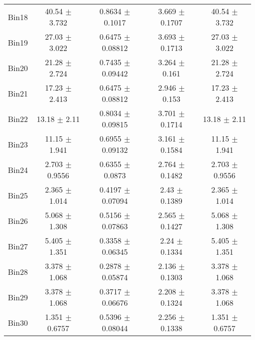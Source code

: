 \begin{tabular}{@{\extracolsep{4pt}}lcccc@{}}
     Bin18 & 40.54 $\pm$ 3.732 & 0.8634 $\pm$ 0.1017 & 3.669 $\pm$ 0.1707 & 40.54 $\pm$ 3.732 \\ 
     Bin19 & 27.03 $\pm$ 3.022 & 0.6475 $\pm$ 0.08812 & 3.693 $\pm$ 0.1713 & 27.03 $\pm$ 3.022 \\ 
     Bin20 & 21.28 $\pm$ 2.724 & 0.7435 $\pm$ 0.09442 & 3.264 $\pm$ 0.161 & 21.28 $\pm$ 2.724 \\ 
     Bin21 & 17.23 $\pm$ 2.413 & 0.6475 $\pm$ 0.08812 & 2.946 $\pm$ 0.153 & 17.23 $\pm$ 2.413 \\ 
     Bin22 & 13.18 $\pm$ 2.11 & 0.8034 $\pm$ 0.09815 & 3.701 $\pm$ 0.1714 & 13.18 $\pm$ 2.11 \\ 
     Bin23 & 11.15 $\pm$ 1.941 & 0.6955 $\pm$ 0.09132 & 3.161 $\pm$ 0.1584 & 11.15 $\pm$ 1.941 \\ 
     Bin24 & 2.703 $\pm$ 0.9556 & 0.6355 $\pm$ 0.0873 & 2.764 $\pm$ 0.1482 & 2.703 $\pm$ 0.9556 \\ 
     Bin25 & 2.365 $\pm$ 1.014 & 0.4197 $\pm$ 0.07094 & 2.43 $\pm$ 0.1389 & 2.365 $\pm$ 1.014 \\ 
     Bin26 & 5.068 $\pm$ 1.308 & 0.5156 $\pm$ 0.07863 & 2.565 $\pm$ 0.1427 & 5.068 $\pm$ 1.308 \\ 
     Bin27 & 5.405 $\pm$ 1.351 & 0.3358 $\pm$ 0.06345 & 2.24 $\pm$ 0.1334 & 5.405 $\pm$ 1.351 \\ 
     Bin28 & 3.378 $\pm$ 1.068 & 0.2878 $\pm$ 0.05874 & 2.136 $\pm$ 0.1303 & 3.378 $\pm$ 1.068 \\ 
     Bin29 & 3.378 $\pm$ 1.068 & 0.3717 $\pm$ 0.06676 & 2.208 $\pm$ 0.1324 & 3.378 $\pm$ 1.068 \\ 
     Bin30 & 1.351 $\pm$ 0.6757 & 0.5396 $\pm$ 0.08044 & 2.256 $\pm$ 0.1338 & 1.351 $\pm$ 0.6757 \\ 
\hline\hline
  \end{tabular}
